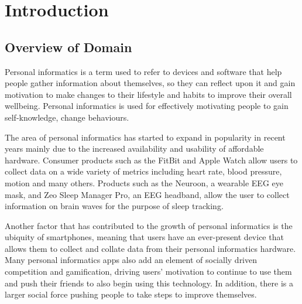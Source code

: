 \section{Introduction}

\subsection{Overview of Domain}


Personal informatics is a term used to refer to devices and software that help people gather
information about themselves, so they can reflect upon it and gain motivation to make changes to
their lifestyle and habits to improve their overall wellbeing. Personal informatics is used for
effectively motivating people to gain self-knowledge, change behaviours. %

The area of personal informatics has started to expand in popularity in recent years mainly due to
the increased availability and usability of affordable hardware. Consumer products such as the
FitBit and Apple Watch allow users to collect data on a wide variety of metrics including heart
rate, blood pressure, motion and many others. Products such as the Neuroon, a wearable EEG eye mask,
and Zeo Sleep Manager Pro, an EEG headband, allow the user to collect information on brain waves for
the purpose of sleep tracking.


Another factor that has contributed to the growth of personal informatics is the ubiquity of
smartphones, meaning that users have an ever-present device that allows them to collect and collate
data from their personal informatics hardware. Many personal informatics apps also add an element of
socially driven competition and gamification, driving users' motivation to continue to use them and
push their friends to also begin using this technology. In addition, there is a larger social force
pushing people to take steps to improve themselves. %



